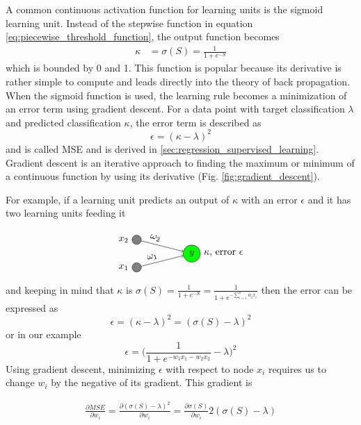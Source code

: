 A common continuous activation function for learning units is the sigmoid learning unit. Instead of the stepwise function in equation \ref{eq:piecewise_threshold_function}, the output function becomes
\begin{align}
  \kappa &= \sigma(S) = \frac{1}{1+e^{-S}}
\end{align}
which is bounded by 0 and 1. This function is popular because its derivative is rather simple to compute and leads directly into the theory of back propagation. When the sigmoid function is used, the learning rule becomes a minimization of an error term using gradient descent. For a data point with target classification $\lambda$ and predicted classification $\kappa$, the error term is described as
$$ \epsilon = (\kappa- \lambda)^2 $$
and is called MSE and is derived in \ref{sec:regression_supervised_learning}. Gradient descent is an iterative approach to finding the maximum or minimum of a continuous function by using its derivative (Fig. \ref{fig:gradient_descent}).


For example, if a learning unit predicts an output of $\kappa$ with an error $\epsilon$ and it has two learning units feeding it


\begin{align*}
  \begin{tikzpicture}
    [   cnode/.style={draw=black,fill=#1,minimum width=3mm,circle},
    ]
        \node[cnode=green,label=0:{$\kappa$, error $\epsilon$}] (s) at (2,-1.5) {$y$};
        \foreach \x in {1,...,2}
        {   \pgfmathparse{\x}
            \node[cnode=gray,label=180:$x_{\pgfmathresult}$] (x-\x) at (0,\x-3) {};
            \draw[->] (x-\x) -- node[above,sloped,pos=0.3] {$\omega_{\pgfmathresult}$} (s);
        }
  \end{tikzpicture}
\end{align*}
and keeping in mind that $\kappa$ is $\sigma(S) = \frac{1}{1+e^{-S}} = \frac{1}{1+e^{-\sum_{i=1}^n w_ix_i}}$ then the error can be expressed as 
$$ \epsilon = (\kappa - \lambda)^2  =  (\sigma(S) - \lambda)^2$$ 
or in our example  
$$ \epsilon = \Big(\frac{1}{1+e^{-w_1x_1-w_2x_2}} - \lambda \Big)^2$$
Using gradient descent, minimizing $\epsilon$ with respect to node $x_i$ requires us to change $w_i$ by the negative of its gradient. This gradient is 

\begin{align}
  \frac{\partial MSE}{\partial w_i} = \frac{\partial(\sigma(S) -\lambda)^2}{\partial w_i}  = \frac{\partial\sigma(S)}{\partial w_i}2(\sigma(S) - \lambda)
  \label{eq:gradient_descent_on_sigma}
\end{align}

